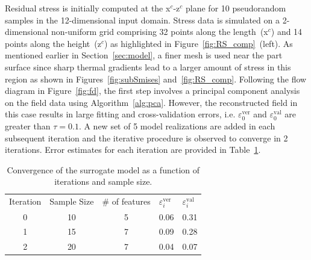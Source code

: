 Residual stress is initially computed at the x$^c$-z$^c$ plane for 10 pseudorandom samples in the 12-dimensional
input domain. Stress data is simulated on a 2-dimensional non-uniform grid comprising 32 points along the
length~(x$^c$) and 14 points along the height~(z$^c$) as highlighted in Figure~\ref{fig:RS_comp}~(left).
As mentioned earlier in Section~\ref{sec:model}, a 
finer mesh is used near the part surface since sharp thermal gradients lead to a larger amount of stress
in this region as shown in Figures~\ref{fig:subSmises} and~\ref{fig:RS_comp}.  Following the flow diagram
in Figure~\ref{fig:fd}, the first step involves a principal component analysis on the field data using  
Algorithm~\ref{alg:pca}. However, the reconstructed field in this case results in large fitting and
cross-validation errors, i.e. $\varepsilon_0^{\text{ver}}$ and $\varepsilon_0^{\text{val}}$
are greater than $\tau=0.1$. A new set of 5 model realizations are added in each subsequent iteration
and the iterative procedure is observed to converge in 2 iterations. Error estimates for each iteration are provided in
Table~\ref{tab:error}.
%
\begin{table}[htbp]
\centering
\caption{Convergence of the surrogate model as a function of iterations and sample size.}
\label{tab:error}
\vspace{1mm}
\begin{tabular}{ cccll}
\toprule
Iteration &  Sample Size & $\#$ of features & $\varepsilon_i^{\text{ver}}$ & $\varepsilon_i^{\text{val}}$\\
0 & 10 & 5 & 0.06 & 0.31 \\
1 & 15 & 7 & 0.09 & 0.28 \\
2 & 20 & 7 & 0.04 & 0.07\\
\bottomrule
\end{tabular}
\end{table}



